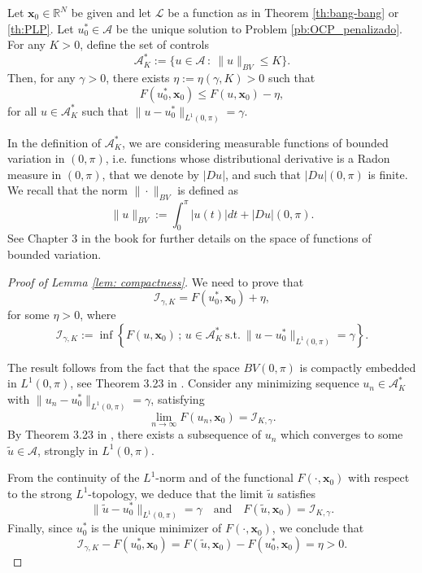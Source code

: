 \documentclass[twocolumn]{autart}    %
\begin{document}
\medskip

\begin{lemma}\label{lem: compactness}
Let $\bm{x}_0\in \mathbb{R}^N$ be given and let $\mathcal{L}$ be a function as in Theorem \ref{th:bang-bang} or \ref{th:PLP}. 
Let $u^\ast_0\in\mathcal{A}$ be the unique solution to Problem \ref{pb:OCP_penalizado}. 
For any $K>0$, define the set of controls
\begin{equation}\label{A star K}
\mathcal{A}_K^\ast := \{ u\in \mathcal{A}\, : \ \| u\|_{BV} \leq K \}.
\end{equation}
Then, for any $\gamma >0$, there exists $\eta:=\eta(\gamma ,K)>0$ such that
$$
F(u^\ast_0, \bm{x}_0 ) \leq F(u, \bm{x}_0 ) - \eta, 
$$
for all $u\in \mathcal{A}_K^\ast$ such that $\|u - u_0^\ast\|_{L^1(0,\pi)} = \gamma$.
\end{lemma}

In the definition of $\mathcal{A}_K^\ast$,  we are considering measurable functions of bounded variation in $(0,\pi)$, i.e. functions whose distributional derivative is a Radon measure in $(0,\pi)$, that we denote by $|Du|$, and such that $|Du|(0,\pi)$ is finite.
We recall that the norm $\| \cdot\|_{BV}$ is defined as
\begin{equation}\label{BV norm}
\| u\|_{BV} := \int_0^\pi |u(t)|dt + |Du| (0,\pi ).
\end{equation}
See Chapter 3 in the book \cite{ambrosio2000functions} for further details on the space of functions of bounded variation.


\begin{proof}[Proof of Lemma \ref{lem: compactness}]
We need to prove that
$$
\mathcal{I}_{\gamma,K} = F(u_0^\ast, \bm{x}_0) + \eta,
$$
for some $\eta>0$, where
$$
\mathcal{I}_{\gamma,K} :=  \inf \left\{ F(u, \bm{x}_0) \, ; \, u\in \mathcal{A}_K^\ast  \ \text{s.t.}\ \|u- u_0^\ast \|_{L^1(0,\pi)} = \gamma \right\}.
$$


The result follows from the fact that the space $BV(0,\pi)$ is compactly embedded in $L^1 (0,\pi)$, see Theorem 3.23 in \cite{ambrosio2000functions}.
Consider any minimizing sequence $u_n\in \mathcal{A}_K^\ast$ with $\| u_n - u^\ast_0\|_{L^1(0,\pi)} =\gamma$, satisfying
$$
\lim_{n\to\infty} F(u_n, \bm{x}_0) = \mathcal{I}_{K,\gamma}.
$$
By Theorem 3.23 in \cite{ambrosio2000functions}, there exists a subsequence of $u_n$ which converges to some $\tilde{u}\in \mathcal{A}$, strongly in $L^1(0,\pi)$.

From the continuity of the $L^1$-norm and of the functional $F(\cdot, \bm{x}_0)$ with respect to the strong $L^1$-topology, we deduce that the limit $\tilde{u}$ satisfies
$$
\| \tilde{u} - u_0^\ast \|_{L^1(0,\pi)} = \gamma \quad \text{and} \quad
F(\tilde{u}, \bm{x}_0) = \mathcal{I}_{K,\gamma}.
$$
Finally, since $u_0^\ast$ is the unique minimizer of $F(\cdot, \bm{x}_0)$, we conclude that
$$
\mathcal{I}_{\gamma, K} - F(u_0^\ast, \bm{x}_0) = 
F(\tilde{u}, \bm{x}_0) - F(u_0^\ast, \bm{x}_0) = \eta >0. 
$$

\end{proof}
\end{document}
